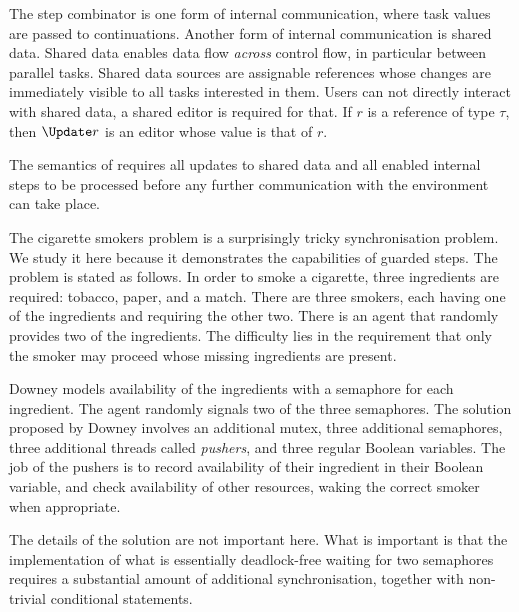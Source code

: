 The step combinator is one form of internal communication, where task values are passed to continuations.
Another form of internal communication is shared data.
Shared data enables data flow \emph{across} control flow, in particular between parallel tasks.
Shared data sources are assignable references whose changes are immediately visible to all tasks interested in them.
Users can not directly interact with shared data, a shared editor is required for that.
If $r$ is a reference of type $\tau$, then $\Update r$ is an editor whose value is that of $r$.

The semantics of \TOPHAT requires all updates to shared data and all enabled internal steps to be processed before any further communication with the environment can take place.


\begin{example}

The cigarette smokers problem \cite{books/Downey08LBOS} is a surprisingly tricky synchronisation problem.
We study it here because it demonstrates the capabilities of guarded steps.
The problem is stated as follows.
In order to smoke a cigarette, three ingredients are required: tobacco, paper, and a match.
There are three smokers, each having one of the ingredients and requiring the other two.
There is an agent that randomly provides two of the ingredients.
The difficulty lies in the requirement that only the smoker may proceed whose missing ingredients are present.

Downey models availability of the ingredients with a semaphore for each ingredient.
The agent randomly signals two of the three semaphores.
The solution proposed by Downey involves an additional mutex, three additional semaphores, three additional threads called \emph{pushers}, and three regular Boolean variables.
The job of the pushers is to record availability of their ingredient in their Boolean variable, and check availability of other resources, waking the correct smoker when appropriate.

The details of the solution are not important here.
What is important is that the implementation of what is essentially deadlock-free waiting for two semaphores requires a substantial amount of additional synchronisation, together with non-trivial conditional statements.


\end{example}
